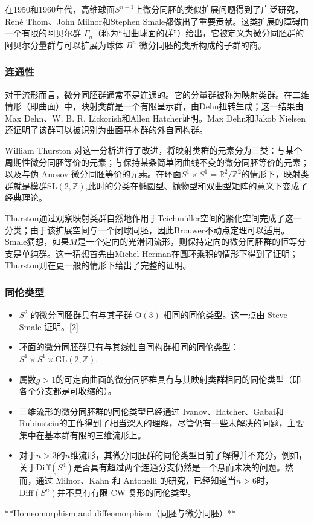 在1950和1960年代，高维球面$S^{n-1}$上微分同胚的类似扩展问题得到了广泛研究，René Thom、John Milnor和Stephen Smale都做出了重要贡献。这类扩展的障碍由一个有限的阿贝尔群 $\Gamma_n$（称为“扭曲球面的群”）给出，它被定义为微分同胚群的阿贝尔分量群与可以扩展为球体 $B^n$ 微分同胚的类所构成的子群的商。
\subsubsection{连通性}
对于流形而言，微分同胚群通常不是连通的。它的分量群被称为映射类群。在二维情形（即曲面）中，映射类群是一个有限呈示群，由Dehn扭转生成；这一结果由Max Dehn、W. B. R. Lickorish和Allen Hatcher证明。Max Dehn和Jakob Nielsen还证明了该群可以被识别为曲面基本群的外自同构群。

William Thurston 对这一分析进行了改进，将映射类群的元素分为三类：与某个周期性微分同胚等价的元素；与保持某条简单闭曲线不变的微分同胚等价的元素；以及与伪 Anosov 微分同胚等价的元素。在环面$S^1 \times S^1 = \mathbb{R}^2 / \mathbb{Z}^2$的情形下，映射类群就是模群$\text{SL}(2, \mathbb{Z})$,此时的分类在椭圆型、抛物型和双曲型矩阵的意义下变成了经典理论。

Thurston通过观察映射类群自然地作用于Teichmüller空间的紧化空间完成了这一分类；由于该扩展空间与一个闭球同胚，因此Brouwer不动点定理可以适用。Smale猜想，如果$M$是一个定向的光滑闭流形，则保持定向的微分同胚群的恒等分支是单纯群。这一猜想首先由Michel Herman在圆环乘积的情形下得到了证明；Thurston则在更一般的情形下给出了完整的证明。
\subsubsection{同伦类型}
\begin{itemize}
\item $S^2$ 的微分同胚群具有与其子群 $\mathrm{O}(3)$ 相同的同伦类型。这一点由 Steve Smale 证明。[2]
\item 环面的微分同胚群具有与其线性自同构群相同的同伦类型：$S^1 \times S^1 \times \mathrm{GL}(2, \mathbb{Z})$.
\item 属数$g > 1$的可定向曲面的微分同胚群具有与其映射类群相同的同伦类型（即各个分支都是可收缩的）。
\item 三维流形的微分同胚群的同伦类型已经通过 Ivanov、Hatcher、Gabai和 Rubinstein的工作得到了相当深入的理解，尽管仍有一些未解决的问题，主要集中在基本群有限的三维流形上。
\item 对于$n > 3$的$n$维流形，其微分同胚群的同伦类型目前了解得并不充分。例如，关于$\mathrm{Diff}(S^4)$是否具有超过两个连通分支仍然是一个悬而未决的问题。然而，通过 Milnor、Kahn 和 Antonelli 的研究，已经知道当$n > 6$时，$\mathrm{Diff}(S^n)$并不具有有限 CW 复形的同伦类型。
\end{itemize}
**Homeomorphism and diffeomorphism（同胚与微分同胚）**

